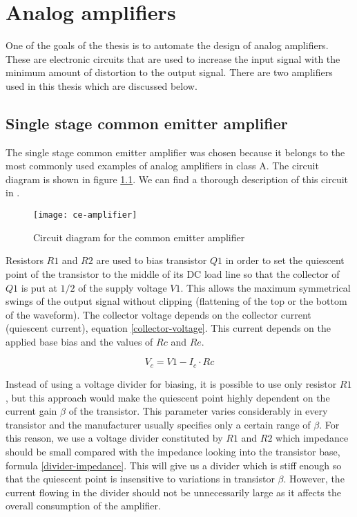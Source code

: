 \chapter{Analog amplifiers}
One of the goals of the thesis is to automate the design of analog amplifiers. These are electronic circuits that are used to increase the input signal with the minimum amount of distortion to the output signal. There are two amplifiers used in this thesis which are discussed below.

\section{Single stage common emitter amplifier} \label{ce-amp}
The single stage common emitter amplifier was chosen because it belongs to the most commonly used examples of analog amplifiers in class A. The circuit diagram is shown in figure \ref{ce-amplifier}. We can find a thorough description of this circuit in \cite{the-art-of-electronics}.

\begin{figure}[H]
    \centering
    \texttt{[image: ce-amplifier]}
    \label{ce-amplifier}
    \caption{Circuit diagram for the common emitter amplifier}
\end{figure}

Resistors $R1$ and $R2$ are used to bias transistor $Q1$ in order to set the quiescent point of the transistor to the middle of its DC load line so that the collector of $Q1$ is put at $1/2$ of the supply voltage $V1$. This allows the maximum symmetrical swings of the output signal without clipping (flattening of the top or the bottom of the waveform). The collector voltage depends on the collector current (quiescent current), equation \ref{collector-voltage}. This current depends on the applied base bias and the values of $Rc$ and $Re$.

\begin{equation} \label{collector-voltage}
    V_c = V1 - I_c \cdot Rc
\end{equation}

Instead of using a voltage divider for biasing, it is possible to use only resistor $R1$, but this approach would make the quiescent point highly dependent on the current gain $\beta$ of the transistor. This parameter varies considerably in every transistor and the manufacturer usually specifies only a certain range of $\beta$. For this reason, we use a voltage divider constituted by $R1$ and $R2$ which impedance should be small compared with the impedance looking into the transistor base, formula \ref{divider-impedance}. This will give us a divider which is stiff enough so that the quiescent point is insensitive to variations in transistor $\beta$. However, the current flowing in the divider should not be unnecessarily large as it affects the overall consumption of the amplifier.

